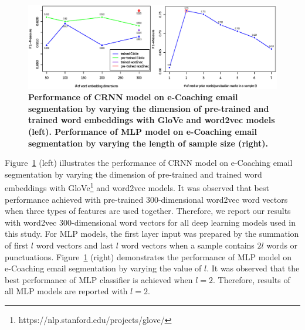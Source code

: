 \documentclass{amia}
\begin{document}
\begin{figure}[!htb]
    \centering
    \includegraphics[width=1.0\textwidth]{figures/mlp-and-vector.eps}
    \caption{\textbf{Performance of CRNN model on e-Coaching email segmentation by varying the dimension of pre-trained and trained word embeddings with GloVe and word2vec models (left). Performance of MLP model on e-Coaching email segmentation by varying the length of sample size (right).}}
    \label{fig:embedding-dimension-mlp}
\end{figure}   
 
Figure~\ref{fig:embedding-dimension-mlp} (left) illustrates the performance of CRNN model on e-Coaching email segmentation by varying the dimension of pre-trained and trained word embeddings with GloVe\footnote{https://nlp.stanford.edu/projects/glove/} and word2vec models. It was observed that best performance achieved with pre-trained 300-dimensional word2vec word vectors when three types of features are used together. Therefore, we report our results with word2vec 300-dimensional word vectors for all deep learning models used in this study. For MLP models, the first layer input was prepared by the summation of first $l$ word vectors and last $l$ word vectors when a sample contains $2l$ words or punctuations. Figure~\ref{fig:embedding-dimension-mlp} (right) demonstrates the performance of MLP model on e-Coaching email segmentation by varying the value of $l$. It was observed that the best performance of MLP classifier is achieved when $l = 2$. Therefore, results of all MLP models are reported with $l = 2$.    
\end{document}
